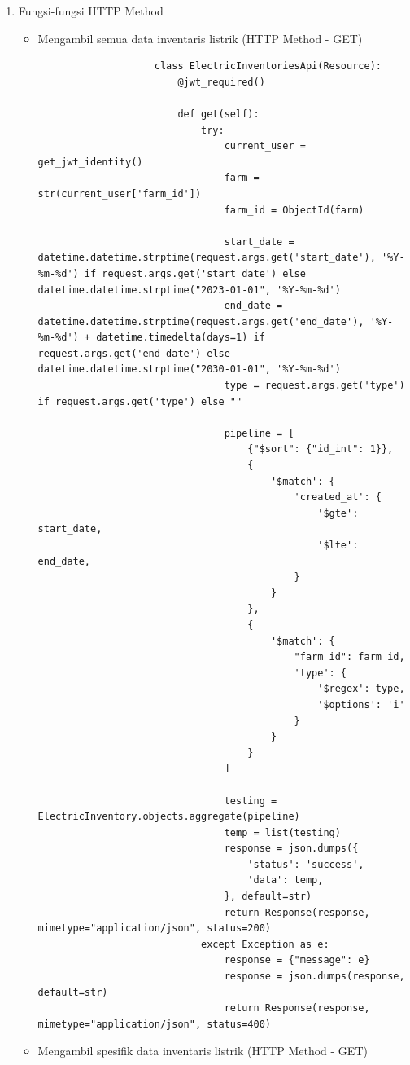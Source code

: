 \begin{spacing}{1.5}
\begin{enumerate}
\begin{enumerate}
\begin{itemize}

				\end{itemize}

			\item Fungsi-fungsi HTTP Method
			
			\begin{itemize}
				\item Mengambil semua data inventaris listrik (HTTP Method - GET)
				
				\begin{lstlisting}
					class ElectricInventoriesApi(Resource):
						@jwt_required()

						def get(self):
							try:
								current_user = get_jwt_identity()
								farm = str(current_user['farm_id'])
								farm_id = ObjectId(farm)
					
								start_date = datetime.datetime.strptime(request.args.get('start_date'), '%Y-%m-%d') if request.args.get('start_date') else datetime.datetime.strptime("2023-01-01", '%Y-%m-%d')
								end_date = datetime.datetime.strptime(request.args.get('end_date'), '%Y-%m-%d') + datetime.timedelta(days=1) if request.args.get('end_date') else datetime.datetime.strptime("2030-01-01", '%Y-%m-%d')
								type = request.args.get('type') if request.args.get('type') else ""
					
								pipeline = [
									{"$sort": {"id_int": 1}},
									{
										'$match': {
											'created_at': {
												'$gte': start_date,
												'$lte': end_date,
											}
										}
									},
									{
										'$match': {
											"farm_id": farm_id,
											'type': {
												'$regex': type,
												'$options': 'i'
											}
										}
									}
								]
							
								testing = ElectricInventory.objects.aggregate(pipeline)
								temp = list(testing)
								response = json.dumps({
									'status': 'success',
									'data': temp,
								}, default=str)
								return Response(response, mimetype="application/json", status=200)
							except Exception as e:
								response = {"message": e}
								response = json.dumps(response, default=str)
								return Response(response, mimetype="application/json", status=400)
				\end{lstlisting}

				\item Mengambil spesifik data inventaris listrik (HTTP Method - GET)
				

\end{itemize}
\end{enumerate}
\end{enumerate}
\end{spacing}
